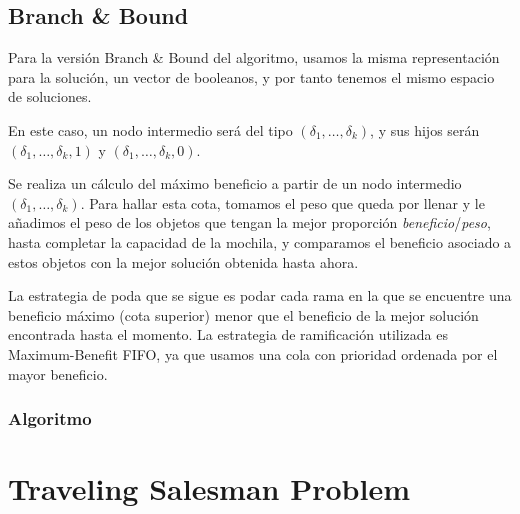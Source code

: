 \documentclass[a4paper, 11pt]{article} %
\begin{document}
  	
          \small
    	\texttt{}
          \normalsize
    

  \subsection{Branch \& Bound}
  
  Para la versión Branch \& Bound del algoritmo, usamos la misma representación para la solución, un vector de booleanos, y por tanto tenemos el mismo espacio de soluciones.
  
  En este caso, un nodo intermedio será del tipo $(\delta_1, \dots, \delta_k)$, y sus hijos serán $(\delta_1, \dots, \delta_k, 1)$ y $(\delta_1, \dots, \delta_k, 0)$.
  
  Se realiza un cálculo del máximo beneficio a partir de un nodo intermedio $(\delta_1, \dots, \delta_k)$. Para hallar esta cota, tomamos el peso que queda por llenar y le añadimos el peso de los objetos que tengan la mejor proporción \textit{beneficio}/\textit{peso}, hasta completar la capacidad de la mochila, y comparamos el beneficio asociado a estos objetos con la mejor solución obtenida hasta ahora.
  
  La estrategia de poda que se sigue es podar cada rama en la que se encuentre una beneficio máximo (cota superior) menor que el beneficio de la mejor solución encontrada hasta el momento. La estrategia de ramificación utilizada es Maximum-Benefit FIFO, ya que usamos una cola con prioridad ordenada por el mayor beneficio.
  
	\subsubsection{Algoritmo}

          \small
    	\texttt{}
          \normalsize



\section{Traveling Salesman Problem}
\end{document}
